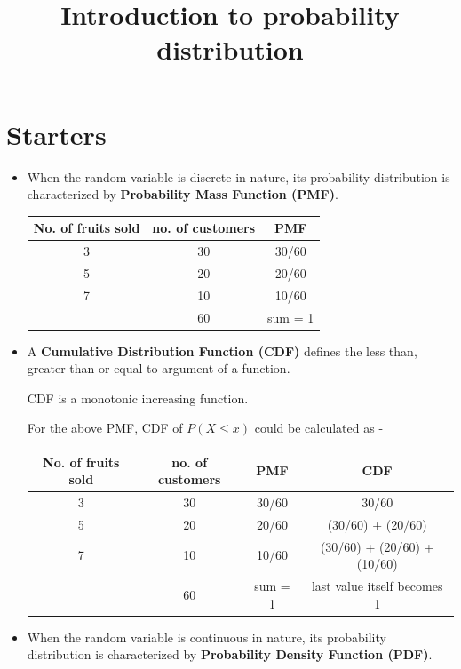 \documentclass{article}
\begin{document}
\title{Introduction to probability distribution}

\maketitle


\section{Starters}
\begin{itemize}
	\item When  the random variable is discrete in nature, its probability distribution is characterized by \textbf{Probability Mass Function (PMF)}.
	\begin{center}
	\begin{tabular}{ |c|c|c| } 
 	\hline
 	\textbf{No. of fruits sold} & \textbf{no. of customers} & \textbf{PMF} \\ 
 	\hline
 	3 & 30 & 30/60 \\ 
 	5 & 20 & 20/60 \\ 
 	7 & 10 & 10/60 \\ 
 	\hline
 	  & 60 & sum = 1 \\ 
 	\hline
	\end{tabular}
	\end{center}
	\item A \textbf{Cumulative Distribution Function (CDF)} defines the less than, greater than or equal to argument of a function.
	
	CDF is a monotonic increasing function.
	
	For the above PMF, CDF of $P(X \le x)$ could be calculated as -
	\begin{center}
	\begin{tabular}{ |c|c|c|c| } 
 	\hline
 	 	\textbf{No. of fruits sold} & \textbf{no. of customers} & \textbf{PMF} & \textbf{CDF}\\ 
 	\hline
 	3 & 30 & 30/60 & 30/60\\ 
 	5 & 20 & 20/60 & (30/60) + (20/60)\\ 
 	7 & 10 & 10/60 & (30/60) + (20/60) + (10/60)\\ 
 	\hline
 	  & 60 & sum = 1 & last value itself becomes 1\\ 
 	\hline
	\end{tabular}
	\end{center}
	\item  When  the random variable is continuous in nature, its probability distribution is characterized by \textbf{Probability Density Function (PDF)}.

\end{itemize}
\end{document}
